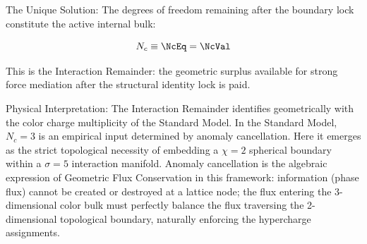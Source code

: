 The Unique Solution: The degrees of freedom remaining after the boundary lock constitute the active internal bulk:

\begin{equation}
    N_c \equiv \NcEq = \mathbf{\NcVal}
\end{equation}

This is the Interaction Remainder: the geometric surplus available for strong force mediation after the structural identity lock is paid.

Physical Interpretation: The Interaction Remainder identifies geometrically with the color charge multiplicity of the Standard Model. In the Standard Model, $N_c = 3$ is an empirical input determined by anomaly cancellation. Here it emerges as the strict topological necessity of embedding a $\chi = 2$ spherical boundary within a $\sigma = 5$ interaction manifold. Anomaly cancellation is the algebraic expression of Geometric Flux Conservation in this framework: information (phase flux) cannot be created or destroyed at a lattice node; the flux entering the 3-dimensional color bulk must perfectly balance the flux traversing the 2-dimensional topological boundary, naturally enforcing the hypercharge assignments.